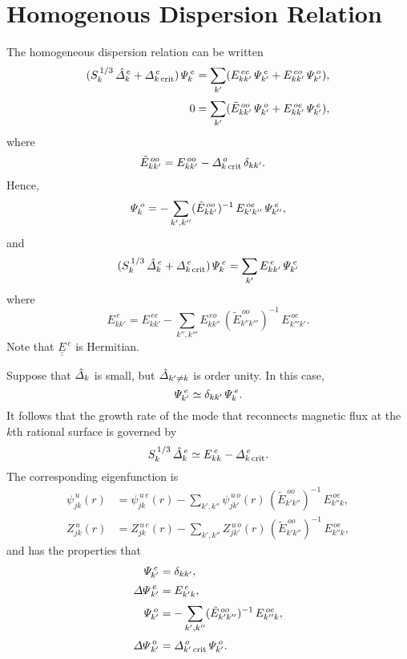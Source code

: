 \documentclass[12pt,prb,aps,notitlepage]{revtex4-1}
\begin{document}
\section{Homogenous Dispersion Relation}
The homogeneous dispersion relation can be written
\begin{align}
(S_k^{\,1/3}\,\hat{\mit\Delta}_k^{\,e}+ {\mit\Delta}_{k\,{\rm crit}}^{\,e})\,{\mit\Psi}_k^{\,e} &= \sum_{k'}(E_{kk'}^{\,ee}\,{\mit\Psi}_{k'}^{\,e}+E_{kk'}^{\,eo}\,{\mit\Psi}_{k'}^{\,o}),\\[0.5ex]
0&= \sum_{k'}(\tilde{E}_{kk'}^{\,oo}\,{\mit\Psi}_{k'}^{\,o}+E_{kk'}^{\,oe}\,{\mit\Psi}_{k'}^{\,e}),\label{e127}
\end{align}
where 
\begin{align}
\tilde{E}^{\,oo}_{kk'} &= E_{kk'}^{\,oo}- {\mit\Delta}_{k\,{\rm crit}}^{\,o}\,\delta_{kk'}.
\end{align}
Hence,
\begin{equation}
{\mit\Psi}_{k}^{\,o} = - \sum_{k',k''}(\tilde{E}^{\,oo}_{kk'})^{-1}\,E^{\,oe}_{k'k''}\,{\mit\Psi}_{k''}^{\,e},
\end{equation}
and
\begin{equation}
(S_k^{\,1/3}\,\hat{\mit\Delta}_k^{\,e}+ {\mit\Delta}_{k\,{\rm crit}}^{\,e})\,{\mit\Psi}_k^{\,e} =\sum_{k'} E^{\,e}_{kk'}\,{\mit\Psi}^{\,e}_{k'}
\end{equation}
where 
\begin{equation}
E^{\,e}_{kk'} = E_{kk'}^{\,ee}- \sum_{k'', k'''} E_{kk''}^{\,eo}\,(\tilde{E}_{k''k'''}^{\,oo})^{-1}\,E_{k'''k'}^{\,oe}.
\end{equation}
Note that $\underline{\underline{E}}^{\,e}$ is Hermitian.

Suppose that $\hat{\mit\Delta}_k$ is small, but  $\hat{\mit\Delta}_{k'\neq k}$ is order unity. In this case, 
\begin{equation}
{\mit\Psi}_{k'}^{\,e} \simeq \delta_{kk'}\,{\mit\Psi}_k^{\,e}.
\end{equation} 
 It follows that the growth rate of the mode that reconnects magnetic flux at the $k$th rational surface is
governed by 
\begin{equation}
S_k^{\,1/3}\,\hat{\mit\Delta}_k^{\,e}\simeq  E^{\,e}_{kk}- {\mit\Delta}_{k\,{\rm crit}}^{\,e}.
\end{equation}
The corresponding eigenfunction is 
\begin{align}
\psi_{jk}^{\,u}(r) &= \psi_{jk}^{\,u\,e}(r)- \sum_{k',k''}\psi_{jk'}^{\,u\,o}(r)\,(\tilde{E}^{\,oo}_{k'k''})^{-1}\,E^{\,oe}_{k''k}, \\[0.5ex]
Z_{jk}^{\,u}(r) &= Z_{jk}^{\,u\,e}(r)- \sum_{k',k''}Z_{jk'}^{\,u\,o}(r)\,(\tilde{E}^{\,oo}_{k'k''})^{-1}\,E^{\,oe}_{k''k},
\end{align}
and has the properties that 
\begin{align}
{\mit\Psi}^{\,e}_{k'}& = \delta_{kk'},\\[0.5ex]
{\mit\Delta\Psi}^{\,e}_{k'} &= E^{\,e}_{k'k},\\[0.5ex]
{\mit\Psi}^{\,o}_{k'} &= - \sum_{k',k''}(\tilde{E}^{\,oo}_{k'k''})^{-1}\,E^{\,oe}_{k''k},\\[0.5ex]
{\mit\Delta\Psi}^{\,o}_{k'} &= {\mit\Delta}_{k'\,{\rm crit}}^{\,o}\,{\mit\Psi}_{k'}^{\,o}. 
\end{align}
\end{document}
